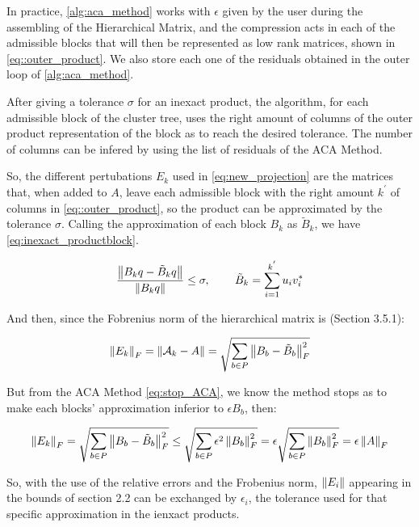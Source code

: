 

In practice, \ref{alg:aca_method} works with $\epsilon$ given by the user during the assembling of the Hierarchical Matrix, and the compression acts in each of the admissible blocks that will then be represented as low rank matrices, shown in \ref{eq::outer_product}. We also store each one of the residuals obtained in the outer loop of \ref{alg:aca_method}.

After giving a tolerance $\sigma$ for an inexact product, the algorithm, for each admissible block of the cluster tree, uses the right amount of columns of the outer product representation of the block as to reach the desired tolerance. The number of columns can be infered by using the list of residuals of the ACA Method.

So, the different pertubations $E_{k}$ used in \ref{eq:new_projection} are the matrices that, when added to $A$, leave each admissible block with the right amount $k^{'}$ of columns in \ref{eq::outer_product}, so the product can be approximated by the tolerance $\sigma$. Calling the approximation of each block $B_{k}$ as $\tilde{B}_{k}$, we have \ref{eq:inexact_productblock}.

\begin{equation}\label{eq:inexact_productblock}
    \frac{\left\lVert B_{k}q - \tilde{B}_{k}q \right\rVert}{\left\lVert B_{k}q\right\rVert} \leq \sigma, \hspace{0.3in} \tilde{B}_{k} = \sum_{i=1} ^{k^{'}} u_{i} v_{i} ^{*}
\end{equation}


And then, since the Fobrenius norm of the hierarchical matrix is \cite{hackbusch2015hierarchical}(Section 3.5.1):

\begin{equation}
    \left\lVert E_{k}\right\rVert_{F}= \left\lVert\mathcal{A}_{k} - A\right\rVert = \sqrt{\sum_{b \in P} \left\lVert B_{b} - \tilde{B}_{b}\right\rVert_{F}^{2} }
\end{equation}

But from the ACA Method \ref{eq:stop_ACA}, we know the method stops as to make each blocks' approximation inferior to $\epsilon B_{b}$, then:

\begin{equation}
    \left\lVert E_{k}\right\rVert_{F} = \sqrt{\sum_{b \in P} \left\lVert B_{b} - \tilde{B}_{b}\right\rVert_{F}^{2} } \leq \sqrt{\sum_{b\in P}\epsilon^{2}\left\lVert B_{b}\right\rVert_{F}^{2}} = \epsilon \sqrt{\sum_{b \in P}\left\lVert B_{b}\right\rVert_{F}^{2}}
    = \epsilon \left\lVert A\right\rVert_{F}
\end{equation}

So, with the use of the relative errors and the Frobenius norm, $\left\lVert E_{i}\right\rVert$ appearing in the bounds of section 2.2 can be exchanged by $\epsilon_{i}$, the tolerance used for that specific approximation in the ienxact products.